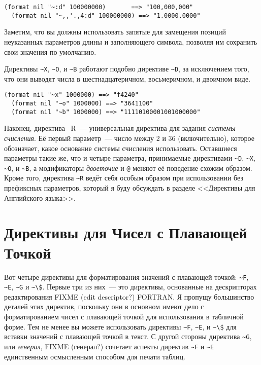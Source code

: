 \begin{lstlisting}[style=lisprepl]
  (format nil "~:d" 100000000)       ==> "100,000,000"
  (format nil "~,,'.,4:d" 100000000) ==> "1.0000.0000"
\end{lstlisting}

Заметим, что вы должны использовать запятые для замещения позиций неуказанных параметров
длины и заполняющего символа, позволяя им сохранить свои значения по умолчанию.

Директивы \lstinline!~X!, \lstinline!~O!, и \lstinline!~B! работают подобно директиве
\lstinline!~D!, за исключением того, что они выводят числа в шестнадцатеричном,
восьмеричном, и двоичном виде.

\begin{lstlisting}[style=lisprepl]
  (format nil "~x" 1000000) ==> "f4240"
  (format nil "~o" 1000000) ==> "3641100"
  (format nil "~b" 1000000) ==> "11110100001001000000"
\end{lstlisting}

Наконец, директива ~R~--- универсальная директива для задания \textit{системы счисления}. Её
первый параметр~--- число между 2 и 36 (включительно), которое обозначает, какое основание
системы счисления использовать. Оставшиеся параметры такие же, что и четыре параметра,
принимаемые директивами \lstinline!~D!, \lstinline!~X!, \lstinline!~O!, и \lstinline!~B!,
а модификаторы \textit{двоеточие} и \lstinline!@! меняют её поведение схожим
образом. Кроме того, директива \lstinline!~R! ведёт себя особым образом при использовании
без префиксных параметров, который я буду обсуждать в разделе <<Директивы для Английского
языка>>.

\section{Директивы для Чисел с Плавающей Точкой}

Вот четыре директивы для форматирования значений с плавающей точкой: \lstinline!~F!,
\lstinline!~E!, \lstinline!~G! и \lstinline!~\$!. Первые три из них~--- это директивы,
основанные на дескрипторах редактирования FIXME (edit descriptor?) FORTRAN. Я пропущу
большинство деталей этих директив, поскольку они в основном имеют дело с форматированием
чисел с плавающей точкой для использования в табличной форме. Тем не менее вы можете
использовать директивы \lstinline!~F!, \lstinline!~E!, и \lstinline!~\$! для вставки
значений с плавающей точкой в текст.  С другой стороны директива \lstinline!~G!, или
\textit{генерал}, FIXME (генерал?)  сочетает аспекты директив \lstinline!~F! и
\lstinline!~E! единственным осмысленным способом для печати таблиц.

